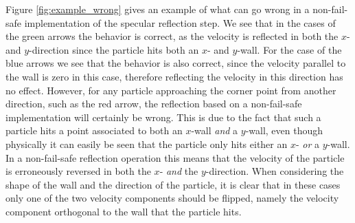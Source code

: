 Figure \ref{fig:example_wrong} gives an example of what can go wrong in a non-fail-safe implementation of the specular reflection step.
We see that in the cases of the green arrows the behavior is correct, as the velocity is reflected in both the $x$- and $y$-direction since the particle hits both an $x$- and $y$-wall. For the case of the blue arrows we see that the behavior is also correct, since the velocity parallel to the wall is zero in this case, therefore reflecting the velocity in this direction has no effect. However, for any particle approaching the corner point from another direction, such as the red arrow, the reflection based on a non-fail-safe implementation will certainly be wrong.  This is due to the fact that such a particle hits a point associated to both an $x$-wall \emph{and} a $y$-wall, even though physically it can easily be seen that the particle only hits either an $x$- \emph{or} a $y$-wall. In a non-fail-safe reflection operation this means that the velocity of the particle is erroneously reversed in both the $x$- \emph{and} the $y$-direction. When considering the shape of the wall and the direction of the particle, it is clear that in these cases only one of the two velocity components should be flipped, namely the velocity component orthogonal to the wall that the particle hits. 




